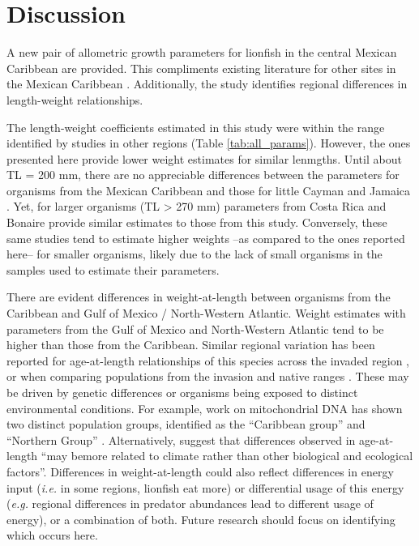 \documentclass[fleqn,10pt,lineno]{wlpeerj} %
\begin{document}
\section*{Discussion}

A new pair of allometric growth parameters for lionfish in the central
Mexican Caribbean are provided. This compliments existing literature for
other sites in the Mexican Caribbean \citep{sabidoitza_2016}.
Additionally, the study identifies regional differences in length-weight
relationships.

The length-weight coefficients estimated in this study were within the
range identified by studies in other regions (Table
\ref{tab:all_params}). However, the ones presented here provide lower
weight estimates for similar lenmgths. Until about TL = 200 mm, there
are no appreciable differences between the parameters for organisms from
the Mexican Caribbean and those for little Cayman \citep{edwards_2014}
and Jamaica \citep{chin_2016}. Yet, for larger organisms (TL
\textgreater{} 270 mm) parameters from Costa Rica \citep{sandel_2015}
and Bonaire \citep{deleon_2013} provide similar estimates to those from
this study. Conversely, these same studies tend to estimate higher
weights --as compared to the ones reported here-- for smaller organisms,
likely due to the lack of small organisms in the samples used to
estimate their parameters.

There are evident differences in weight-at-length between organisms from
the Caribbean and Gulf of Mexico / North-Western Atlantic. Weight
estimates with parameters from the Gulf of Mexico and North-Western
Atlantic tend to be higher than those from the Caribbean. Similar
regional variation has been reported for age-at-length relationships of
this species across the invaded region \citep{fogg_2015}, or when
comparing populations from the invasion and native ranges
\citep{pusack_2016}. These may be driven by genetic differences or
organisms being exposed to distinct environmental conditions. For
example, work on mitochondrial DNA has shown two distinct population
groups, identified as the ``Caribbean group'' and ``Northern Group''
\citep{betancurr_201}. Alternatively, \citet{fogg_2015} suggest that
differences observed in age-at-length ``may bemore related to climate
rather than other biological and ecological factors''. Differences in
weight-at-length could also reflect differences in energy input
(\emph{i.e.} in some regions, lionfish eat more) or differential usage
of this energy (\emph{e.g.} regional differences in predator abundances
lead to different usage of energy), or a combination of both. Future
research should focus on identifying which occurs here.
\end{document}
